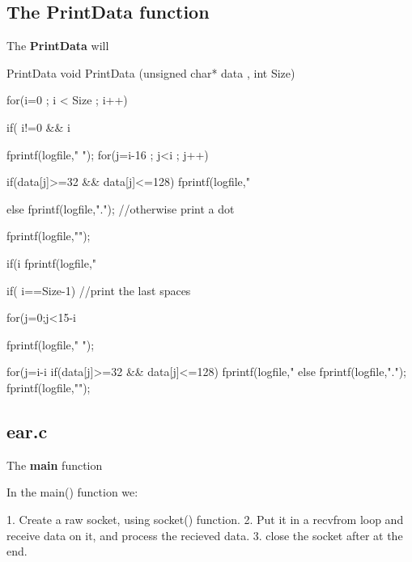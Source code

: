 \subsection{The PrintData function}
\label{PrintData}
The {\bf PrintData} will 

\begin{chunk}{PrintData}
void PrintData (unsigned char* data , int Size)
{
     
    for(i=0 ; i < Size ; i++)
    {
        if( i!=0 && i%
        {
            fprintf(logfile,"         ");
            for(j=i-16 ; j<i ; j++)
            {
                if(data[j]>=32 && data[j]<=128)
                    fprintf(logfile,"%
                 
                else fprintf(logfile,"."); //otherwise print a dot
            }
            fprintf(logfile,"\n");
        }
         
        if(i%
            fprintf(logfile," %
                 
        if( i==Size-1)  //print the last spaces
        {
            for(j=0;j<15-i%
             
            fprintf(logfile,"         ");
             
            for(j=i-i%
            {
                if(data[j]>=32 && data[j]<=128) fprintf(logfile,"%
                else fprintf(logfile,".");
            }
            fprintf(logfile,"\n");
        }
    }
}

\end{chunk}

\subsection{ear.c}
\noindent
The {\bf main} function 

In the main() function we:

1. Create a raw socket, using socket() function.
2. Put it in a recvfrom loop and receive data on it, and process the recieved data.
3. close the socket after at the end.


